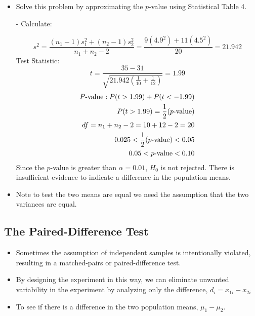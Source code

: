 \documentclass[12pt, letterpaper]{article}
\begin{document}
                \begin{itemize}
                    \item Solve this problem by approximating the $p$-value using Statistical Table 4. \newpage
                    \item[-] Calculate:
                    \begin{mdframed}[leftmargin=0.5cm, rightmargin=0.5cm]
                        \begin{equation*}
                            s^2 = \frac{(n_1 - 1)s_1^2 + (n_2 - 1)s_2^2}{n_1 + n_2 - 2} = \frac{9(4.9^2) + 11(4.5^2)}{20} = 21.942
                        \end{equation*}
                        Test Statistic:
                        \begin{equation*}
                            t = \frac{35 - 31}{\sqrt{21.942\left(\frac{1}{10} + \frac{1}{12}\right)}} = 1.99
                        \end{equation*}
                        \begin{align*}
                            P\textnormal{-value}: P(t > 1.99) + P(t < -1.99) \\
                            P(t > 1.99) = \frac{1}{2}(p\textnormal{-value}) \\ 
                            df = n_1 + n_2 - 2 = 10 + 12 - 2 = 20 \\ 
                            0.025 < \frac{1}{2}(p\textnormal{-value}) < 0.05 \\ 
                            0.05 < p\textnormal{-value} < 0.10
                        \end{align*}
                        Since the $p$-value is greater than $\alpha = 0.01$, $H_0$ is not rejected. There is insufficient evidence to indicate a difference in the population means.
                    \end{mdframed}
                    \item Note to test the two means are equal we need the assumption that the two variances are equal.
                \end{itemize}
        \subsection{The Paired-Difference Test}
            \begin{itemize}
                \item Sometimes the assumption of independent samples is intentionally violated, resulting in a matched-pairs or paired-difference test.
                \item By designing the experiment in this way, we can eliminate unwanted variability in the experiment by analyzing only the difference, $d_i = x_{1i} - x_{2i}$
                \item To see if there is a difference in the two population means, $\mu_1 - \mu_2$.
            \end{itemize}
\end{document}
